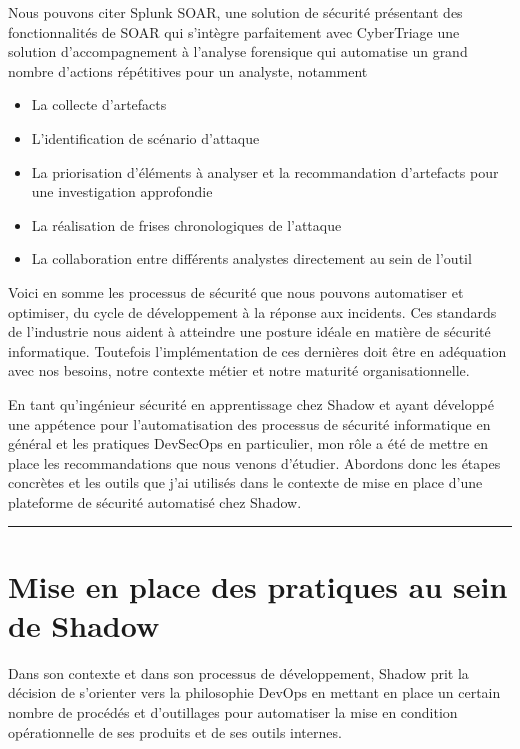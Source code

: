 \documentclass[
  11pt,
  a4paper,
  krantz2,
  11pt,
  oneside]{krantz}
\begin{document}
Nous pouvons citer Splunk SOAR, une solution de sécurité présentant des fonctionnalités de SOAR qui s'intègre parfaitement avec CyberTriage une solution d'accompagnement à l'analyse forensique qui automatise un grand nombre d'actions répétitives pour un analyste, notamment

\begin{itemize}
\item
  La collecte d'artefacts
\item
  L'identification de scénario d'attaque
\item
  La priorisation d'éléments à analyser et la recommandation d'artefacts pour une investigation approfondie
\item
  La réalisation de frises chronologiques de l'attaque
\item
  La collaboration entre différents analystes directement au sein de l'outil
\end{itemize}

Voici en somme les processus de sécurité que nous pouvons automatiser et optimiser, du cycle de développement à la réponse aux incidents. Ces standards de l'industrie nous aident à atteindre une posture idéale en matière de sécurité informatique. Toutefois l'implémentation de ces dernières doit être en adéquation avec nos besoins, notre contexte métier et notre maturité organisationnelle.

En tant qu'ingénieur sécurité en apprentissage chez Shadow et ayant développé une appétence pour l'automatisation des processus de sécurité informatique en général et les pratiques DevSecOps en particulier, mon rôle a été de mettre en place les recommandations que nous venons d'étudier. Abordons donc les étapes concrètes et les outils que j'ai utilisés dans le contexte de mise en place d'une plateforme de sécurité automatisé chez Shadow.

\begin{center}\rule{0.5\linewidth}{0.5pt}\end{center}

\chapter{Mise en place des pratiques au sein de Shadow}\label{mise-en-place-des-pratiques-au-sein-de-shadow}

Dans son contexte et dans son processus de développement, Shadow prit la décision de s'orienter vers la philosophie DevOps en mettant en place un certain nombre de procédés et d'outillages pour automatiser la mise en condition opérationnelle de ses produits et de ses outils internes.
\end{document}
